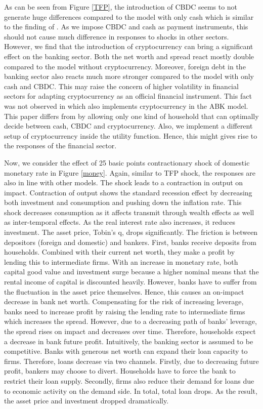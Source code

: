 \documentclass[12pt, a4paper]{article}
\begin{document}
As can be seen from Figure \ref{TFP}, the introduction of CBDC seems to not generate huge differences compared to the model with only cash which is similar to the finding of \cite{minesso2022central}. As we impose CBDC and cash as payment instruments, this should not cause much difference in responses to shocks in other sectors. However, we find that the introduction of cryptocurrency can bring a significant effect on the banking sector. Both the net worth and spread react mostly double compared to the model without cryptocurrency. Moreover, foreign debt in the banking sector also reacts much more stronger compared to the model with only cash and CBDC. This may raise the concern of higher volatility in financial sectors for adapting cryptocurrency as an official financial instrument. This fact was not observed in \cite{murakami2021cryptocurrencies} which also implements cryptocurrency in the ABK model. This paper differs from \cite{murakami2021cryptocurrencies} by allowing only one kind of household that can optimally decide between cash, CBDC and cryptocurrency. Also, we implement a different setup of cryptocurrency inside the utility function. Hence, this might gives rise to the responses of the financial sector.

Now,  we consider the effect of 25 basic points contractionary shock of domestic monetary rate in Figure \ref{money}. Again, similar to TFP shock, the responses are also in line with other models. The shock leads to a contraction in output on impact. Contraction of output shows the standard recession effect by decreasing both investment and consumption and pushing down the inflation rate. This shock decreases consumption as it affects transmit through wealth effects as well as inter-temporal effects. As the real interest rate also increases, it reduces investment. The asset price, Tobin's q, drops significantly. The friction is between depositors (foreign and domestic) and bankers. First, banks receive deposits from households. Combined with their current net worth, they make a profit by lending this to intermediate firms. With an increase in monetary rate, both capital good value and investment surge because a higher nominal means that the rental income of capital is discounted heavily. However, banks have to suffer from the fluctuation in the asset price themselves. Hence, this causes an on-impact decrease in bank net worth.  Compensating for the risk of increasing leverage, banks need to increase profit by raising the lending rate to intermediate firms which increases the spread. However, due to a decreasing path of banks' leverage, the spread rises on impact and decreases over time. Therefore, households expect a decrease in bank future profit. Intuitively, the banking sector is assumed to be competitive. Banks with generous net worth can expand their loan capacity to firms. Therefore, loans decrease via two channels. Firstly, due to decreasing future profit, bankers may choose to divert. Households have to force the bank to restrict their loan supply. Secondly, firms also reduce their demand for loans due to economic activity on the demand side. In total, total loan drops. As the result, the asset price and investment dropped dramatically.
\end{document}
